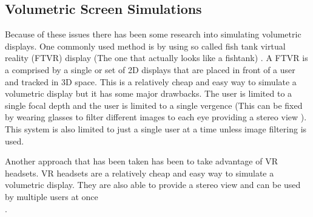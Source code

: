 \subsection{Volumetric Screen Simulations}
Because of these issues there has been some research into simulating volumetric displays. One commonly used method is by using so called fish tank virtual reality (FTVR) display \tocite(The one that actually looks like a fishtank) \cite{Zabarauskas2012}. A FTVR is a comprised by a single or set of 2D displays that are placed in front of a user and tracked in 3D space. This is a relatively cheap and easy way to simulate a volumetric display but it has some major drawbacks. The user is limited to a single focal depth and the user is limited to a single vergence (This can be fixed by wearing glasses to filter different images to each eye providing a stereo view \tocite). This system is also limited to just a single user at a time unless image filtering is used. 

Another approach that has been taken has been to take advantage of VR headsets. VR headsets are a relatively cheap and easy way to simulate a volumetric display. They are also able to provide a stereo view and can be used by multiple users at once \\\cite{10.1145/3290605.3300763}.